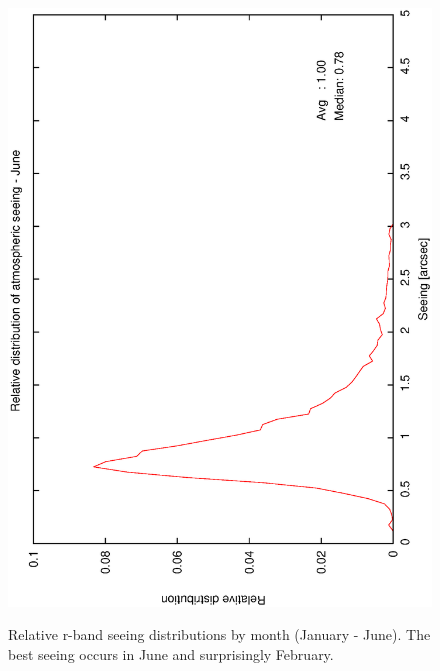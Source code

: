 {{\begin{figure}[htbp]
\begin{center}
{   \includegraphics[scale=0.25, angle=-90]{figures/ecs/corr_see_dist_jun.eps}   
   \label{fig:see_dist_jun}
  }
 \end{center}
  \caption[Relative r-band seeing distributions by month (January - June).]
	  {Relative r-band seeing distributions by month (January - June). The best seeing occurs in June and surprisingly February.}
\label{fig:see_dist_janjun}
\end{figure}

}}
